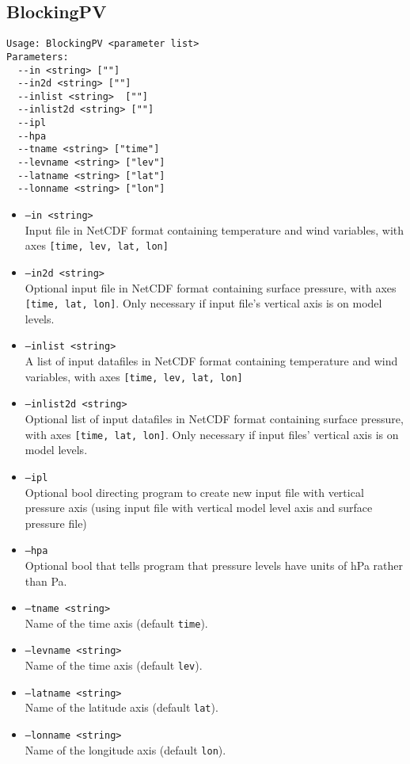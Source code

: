 \documentclass{article}
\begin{document}
\subsection{BlockingPV}\label{PV}
\begin{verbatim}
Usage: BlockingPV <parameter list>
Parameters:
  --in <string> [""]
  --in2d <string> [""]
  --inlist <string>  [""]
  --inlist2d <string> [""]
  --ipl
  --hpa
  --tname <string> ["time"]
  --levname <string> ["lev"]
  --latname <string> ["lat"]
  --lonname <string> ["lon"]
\end{verbatim}

\begin{itemize}
\item[]\texttt{--in <string>} \\ Input file in NetCDF format containing temperature and wind variables, with axes \texttt{[time, lev, lat, lon]}
\item[]\texttt{--in2d <string>} \\ Optional input file in NetCDF format containing surface pressure, with axes \texttt{[time, lat, lon]}. Only necessary if input file's vertical axis is on model levels.
\item[]\texttt{--inlist <string>} \\ A list of input datafiles in NetCDF format containing temperature and wind variables, with axes \texttt{[time, lev, lat, lon]}
\item[]\texttt{--inlist2d <string>} \\ Optional list of input datafiles in NetCDF format containing surface pressure, with axes \texttt{[time, lat, lon]}. Only necessary if input files' vertical axis is on model levels.
\item[]\texttt{--ipl}\\ Optional bool directing program to create new input file with vertical pressure axis (using input file with vertical model level axis and surface pressure file)
\item[]\texttt{--hpa} \\ Optional bool that tells program that pressure levels have units of hPa rather than Pa.
\item[] \texttt{--tname <string>}\\Name of the time axis (default \texttt{time}).
\item[] \texttt{--levname <string>}\\Name of the time axis (default \texttt{lev}).
\item[]\texttt{--latname <string>}\\Name of the latitude axis (default \texttt{lat}).
\item[]\texttt{--lonname <string>}\\Name of the longitude axis (default \texttt{lon}).
\end{itemize}
\end{document}
